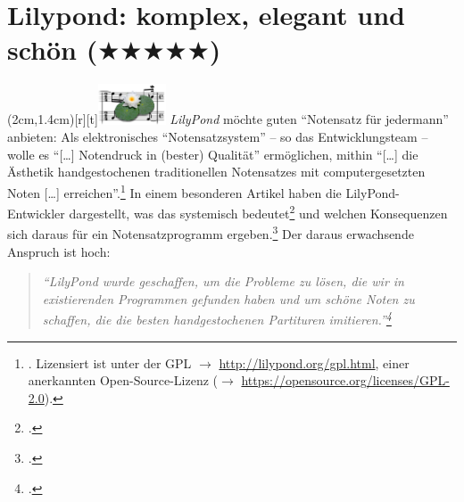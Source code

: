 %
%
%



\section{Lilypond: komplex, elegant und schön ($\bigstar\bigstar\bigstar\bigstar\bigstar$)}
\label{LilyPondBackend}
\parpic(2cm,1.4cm)[r][t]{\includegraphics[width=2cm]{logos/lilypond-300dpi.png}}
\textit{LilyPond} möchte guten \enquote{Notensatz für jedermann} anbieten: Als
elektronisches \enquote{Notensatzsystem} -- so das Entwicklungsteam -- wolle es
\enquote{[\ldots] Notendruck in (bester) Qualität} ermöglichen, mithin
\enquote{[\ldots] die Ästhetik handgestochenen traditionellen Notensatzes mit
computergesetzten Noten [\ldots] erreichen}.\footnote{\cite[vgl.][\nopage
wp.]{LilyPond2018a}. Lizensiert ist  unter der GPL $\rightarrow$
\href{http://lilypond.org/gpl.html}{http://lilypond.org/gpl.html}, einer
anerkannten Open-Source-Lizenz ($\rightarrow$
\href{https://opensource.org/licenses/GPL-2.0}
{https://opensource.org/licenses/GPL-2.0}). } In einem besonderen Artikel haben
die LilyPond-Entwickler dargestellt, was das systemisch
bedeutet\footcite[vgl.][5ff]{LilyPond2018d} und welchen Konsequenzen sich daraus
für ein Notensatzprogramm ergeben.\footcite[vgl.][8ff]{LilyPond2018d} Der daraus
erwachsende Anspruch ist hoch:

\begin{quote}\textit{\enquote{LilyPond wurde geschaffen, um die Probleme zu
lösen, die wir in existierenden Programmen gefunden haben und um schöne Noten zu
schaffen, die die besten handgestochenen Partituren
imitieren.}\footcite[vgl.][2]{LilyPond2018d} }
\end{quote}

